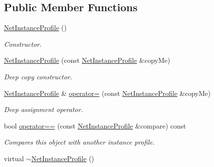 \subsection*{Public Member Functions}
\begin{DoxyCompactItemize}
\item 
\hypertarget{class_net_instance_profile_aa3442dc52d4b8f43f7494df0f62be347}{
\hyperlink{class_net_instance_profile_aa3442dc52d4b8f43f7494df0f62be347}{NetInstanceProfile} ()}
\label{class_net_instance_profile_aa3442dc52d4b8f43f7494df0f62be347}

\begin{DoxyCompactList}\small\item\em Constructor. \item\end{DoxyCompactList}\item 
\hyperlink{class_net_instance_profile_afb388a609224bd742f6db0d0b7b1d6a7}{NetInstanceProfile} (const \hyperlink{class_net_instance_profile}{NetInstanceProfile} \&copyMe)
\begin{DoxyCompactList}\small\item\em Deep copy constructor. \item\end{DoxyCompactList}\item 
\hyperlink{class_net_instance_profile}{NetInstanceProfile} \& \hyperlink{class_net_instance_profile_adb152f79d06708b6f557c8d2a86cd424}{operator=} (const \hyperlink{class_net_instance_profile}{NetInstanceProfile} \&copyMe)
\begin{DoxyCompactList}\small\item\em Deep assignment operator. \item\end{DoxyCompactList}\item 
bool \hyperlink{class_net_instance_profile_a8bfa833d397c682b21eedd7b345b497d}{operator==} (const \hyperlink{class_net_instance_profile}{NetInstanceProfile} \&compare) const 
\begin{DoxyCompactList}\small\item\em Compares this object with another instance profile. \item\end{DoxyCompactList}\item 
\hypertarget{class_net_instance_profile_a55b654936fc693d7a4ab2e25f69413aa}{
virtual \hyperlink{class_net_instance_profile_a55b654936fc693d7a4ab2e25f69413aa}{$\sim$NetInstanceProfile} ()}
\label{class_net_instance_profile_a55b654936fc693d7a4ab2e25f69413aa}


\end{DoxyCompactItemize}
